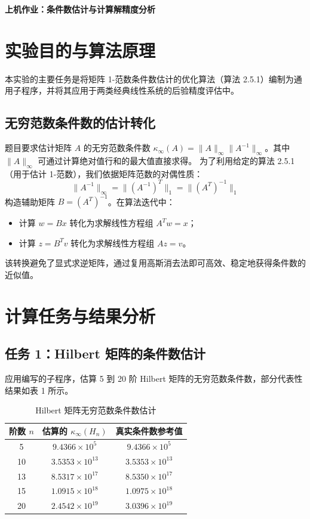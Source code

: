 \documentclass[a4paper,11pt]{article}
\begin{document}
\begin{center}
    \Large\textbf{上机作业：条件数估计与计算解精度分析}
\end{center}

\section{实验目的与算法原理}
本实验的主要任务是将矩阵 1-范数条件数估计的优化算法（算法 2.5.1）编制为通用子程序，并将其应用于两类经典线性系统的后验精度评估中。

\subsection{无穷范数条件数的估计转化}
题目要求估计矩阵 $A$ 的无穷范数条件数 $\kappa_\infty(A) = \|A\|_\infty \|A^{-1}\|_\infty$。其中 $\|A\|_\infty$ 可通过计算绝对值行和的最大值直接求得。
为了利用给定的算法 2.5.1（用于估计 1-范数），我们依据矩阵范数的对偶性质：
\begin{equation}
\|A^{-1}\|_\infty = \|(A^{-1})^T\|_1 = \|(A^T)^{-1}\|_1
\end{equation}
构造辅助矩阵 $B = (A^T)^{-1}$。在算法迭代中：
\begin{itemize}
    \item 计算 $w = Bx$ 转化为求解线性方程组 $A^T w = x$；
    \item 计算 $z = B^T v$ 转化为求解线性方程组 $A z = v$。
\end{itemize}
该转换避免了显式求逆矩阵，通过复用高斯消去法即可高效、稳定地获得条件数的近似值。

\section{计算任务与结果分析}

\subsection{任务 1：Hilbert 矩阵的条件数估计}
应用编写的子程序，估算 5 到 20 阶 Hilbert 矩阵的无穷范数条件数，部分代表性结果如表 1 所示。

\begin{table}[h]
\centering
\caption{Hilbert 矩阵无穷范数条件数估计}
\begin{tabular}{ccc}
\toprule
阶数 $n$ & 估算的 $\kappa_\infty(H_n)$ & 真实条件数参考值 \\
\midrule
5  & $9.4366 \times 10^{5}$  & $9.4366 \times 10^{5}$ \\
10 & $3.5353 \times 10^{13}$ & $3.5353 \times 10^{13}$ \\
13 & $8.5317 \times 10^{17}$ & $8.5350 \times 10^{17}$ \\
15 & $1.0915 \times 10^{18}$ & $1.0975 \times 10^{18}$ \\
20 & $2.4542 \times 10^{19}$ & $3.0396 \times 10^{19}$ \\
\bottomrule
\end{tabular}
\end{table}
\end{document}
